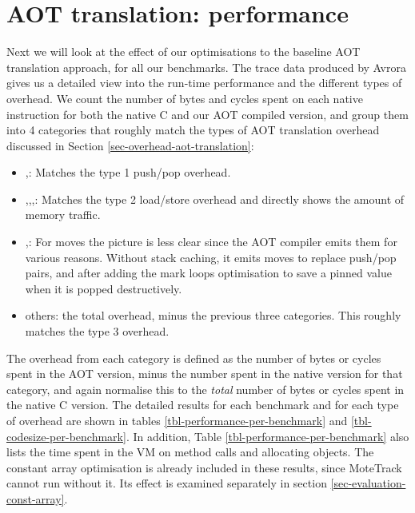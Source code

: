


\section{AOT translation: performance}
\label{sec-evaluation-aot-translation-performance}

Next we will look at the effect of our optimisations to the baseline AOT translation approach, for all our benchmarks. The trace data produced by Avrora gives us a detailed view into the run-time performance and the different types of overhead. We count the number of bytes and cycles spent on each native instruction for both the native C and our AOT compiled version, and group them into 4 categories that roughly match the types of AOT translation overhead discussed in Section \ref{sec-overhead-aot-translation}:
\begin{itemize}
	\item {},: Matches the type 1 push/pop overhead.
	\item {},,,: Matches the type 2 load/store overhead and directly shows the amount of memory traffic.
	\item {},: For moves the picture is less clear since the AOT compiler emits them for various reasons. Without stack caching, it emits moves to replace push/pop pairs, and after adding the mark loops optimisation to save a pinned value when it is popped destructively.
	\item others: the total overhead, minus the previous three categories. This roughly matches the type 3 overhead.
\end{itemize}

The overhead from each category is defined as the number of bytes or cycles spent in the AOT version, minus the number spent in the native version for that category, and again normalise this to the \emph{total} number of bytes or cycles spent in the native C version. The detailed results for each benchmark and for each type of overhead are shown in tables \ref{tbl-performance-per-benchmark} and \ref{tbl-codesize-per-benchmark}. In addition, Table \ref{tbl-performance-per-benchmark} also lists the time spent in the VM on method calls and allocating objects. The constant array optimisation is already included in these results, since MoteTrack cannot run without it. Its effect is examined separately in section \ref{sec-evaluation-const-array}.

